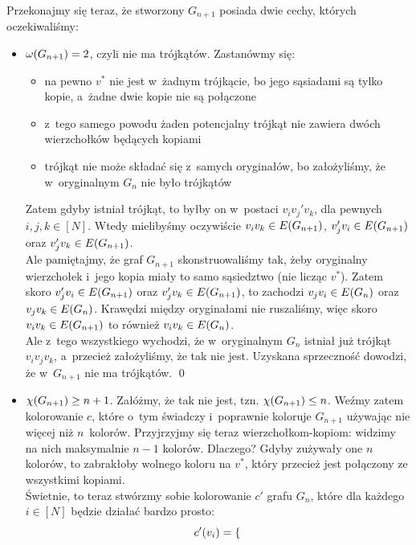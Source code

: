 Przekonajmy się teraz, że stworzony $G_{n + 1}$ posiada dwie cechy, których oczekiwaliśmy:
\begin{itemize}
	\item $\omega\pars{G_{n + 1}} = 2$, czyli nie ma trójkątów. Zastanówmy się:
	      \begin{itemize}
		      \item na pewno $v^\ast$ nie jest w~żadnym trójkącie, bo jego sąsiadami są tylko kopie, a~żadne dwie kopie nie są połączone
		      \item z~tego samego powodu żaden potencjalny trójkąt nie zawiera dwóch wierzchołków będących kopiami
		      \item trójkąt nie może składać się z~samych oryginałów, bo założyliśmy, że w~oryginalnym $G_n$ nie było trójkątów
	      \end{itemize}
	      Zatem gdyby istniał trójkąt, to byłby on w~postaci $v_iv_j'v_k$, dla pewnych $i, j, k \in [N]$. Wtedy mielibyśmy oczywiście $v_iv_k \in E\pars{G_{n + 1}}$, $v_j'v_i \in E\pars{G_{n + 1}}$ oraz $v_j'v_k \in E\pars{G_{n + 1}}$.\\
	      Ale pamiętajmy, że graf $G_{n + 1}$ skonstruowaliśmy tak, żeby oryginalny wierzchołek i~jego kopia miały to samo sąsiedztwo (nie licząc $v^\ast$). Zatem skoro $v_j'v_i \in E\pars{G_{n + 1}}$ oraz $v_j'v_k \in E\pars{G_{n + 1}}$, to zachodzi $v_jv_i \in E\pars{G_n}$ oraz $v_jv_k \in E\pars{G_n}$. Krawędzi między oryginałami nie ruszaliśmy, więc skoro $v_iv_k \in E\pars{G_{n + 1}}$ to również $v_iv_k \in E\pars{G_n}$.\\
	      Ale z~tego wszystkiego wychodzi, że w~oryginalnym $G_n$ istniał już trójkąt $v_iv_jv_k$, a~przecież założyliśmy, że tak nie jest. Uzyskana sprzeczność dowodzi, że w~$G_{n + 1}$ nie ma trójkątów.
	      \qed
	\item $\chi\pars{G_{n + 1}} \geq n + 1$.
	      Załóżmy, że tak nie jest, tzn. $\chi\pars{G_{n + 1}} \leq n$. Weźmy zatem kolorowanie $c$, które o~tym świadczy i~poprawnie koloruje $G_{n + 1}$ używając nie więcej niż $n$~kolorów. Przyjrzyjmy się teraz wierzchołkom-kopiom: widzimy na nich maksymalnie $n - 1$ kolorów. Dlaczego? Gdyby zużywały one $n$ kolorów, to zabrakłoby wolnego koloru na $v^\ast$, który przecież jest połączony ze wszystkimi kopiami.\\
	      Świetnie, to teraz stwórzmy sobie kolorowanie $c'$ grafu $G_n$, które dla każdego $i \in [N]$ będzie działać bardzo prosto:
	      \begin{equation*}
		      c'\pars{v_i} = \begin{cases}

\end{cases}
\end{equation*}
\end{itemize}
